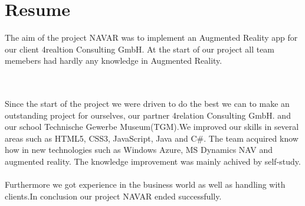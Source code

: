 \chapter{Resume}\label{chapter:Resume}
The aim of the project NAVAR was to implement an Augmented Reality app for our client 4realtion Consulting GmbH. At the start of our project all team memebers had hardly any knowledge in Augmented Reality. 


\
\\\\
Since the start of the project we were driven to do the best we can to make an outstanding project for ourselves, our partner 4relation Consulting GmbH. and our school Technische Gewerbe Museum(TGM).We improved our skills in several areas such as HTML5, CSS3, JavaScript, Java and C\#. The team acquired know how in new technologies such as Windows Azure, MS Dynamics NAV and augmented reality. The knowledge improvement was mainly achived by self-study. 
\\
\\
 Furthermore we got experience in the business world as well as handling with clients.In conclusion our project NAVAR ended successfully. 
\clearpage